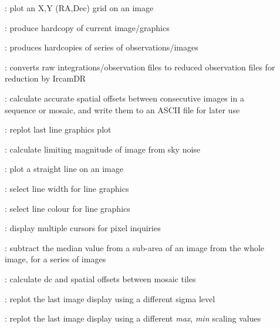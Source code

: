 \begin{description}
\begin{description}
\item []: plot an X,Y (RA,Dec) grid on an image

\item []: produce hardcopy of current
image/graphics

\item []: produces hardcopies of series of
observations/images

\item []: converts raw integrations/observation
files to reduced observation files for reduction by {\sc IrcamDR}

\item []: calculate accurate spatial offsets
between consecutive images in a sequence or mosaic, and write them to
an ASCII file for later use

\item []: replot last line graphics plot

\item []: calculate limiting magnitude of image
from sky noise

\item []: plot a straight line on an image

\item []: select line width for line graphics

\item []: select line colour for line graphics

\item []: display multiple cursors for pixel
inquiries

\item []: subtract the median value from a
sub-area of an image from the whole image, for a series of images

\item []: calculate dc and spatial offsets
between mosaic tiles

\item []: replot the last {\bf
{}} image display using a different sigma level

\item []: replot the last {\bf
{}} image display using a different {\it max},{\it
min} scaling values


\end{description}
\end{description}
